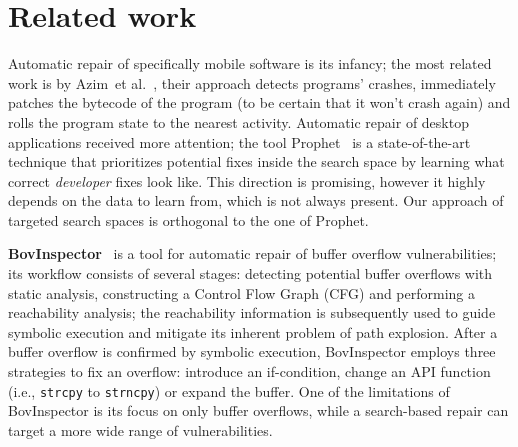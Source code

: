 \section{Related work}
\label{section:related}

Automatic repair of specifically mobile software is its infancy; the most related work is by Azim~et al.~\cite{azim2014towards}, their approach detects programs' crashes, immediately patches the bytecode of the program (to be certain that it won't crash again) and rolls the program state to the nearest activity.
Automatic repair of desktop applications received more attention; the tool Prophet~\cite{long2015prophet} is a state-of-the-art technique that prioritizes potential fixes inside the search space by learning what correct \emph{developer} fixes look like.
This direction is promising, however it highly depends on the data to learn from, which is not always present.
Our approach of targeted search spaces is orthogonal to the one of Prophet.

\textbf{BovInspector}~\cite{bovinspector} is a tool for automatic repair of buffer overflow vulnerabilities; its workflow consists of several stages: detecting potential buffer overflows with static analysis, constructing a Control Flow Graph (CFG) and performing a reachability analysis; the reachability information is subsequently used to guide symbolic execution and mitigate its inherent problem of path explosion.
After a buffer overflow is confirmed by symbolic execution, BovInspector employs three strategies to fix an overflow: introduce an if-condition, change an API function (i.e., \texttt{strcpy} to \texttt{strncpy}) or expand the buffer.
One of the limitations of BovInspector is its focus on only buffer overflows, while a search-based repair can target a more wide range of vulnerabilities.

